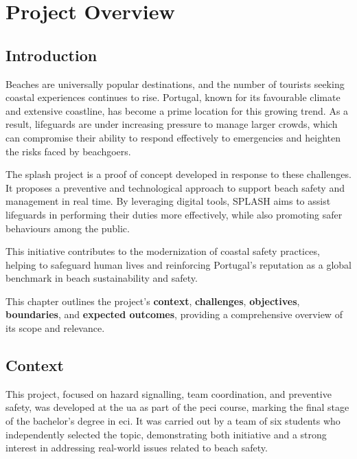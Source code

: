 \chapter{Project Overview}
\label{chapter:overview}

\section{Introduction}
\label{section:intro}

Beaches are universally popular destinations, and the number of tourists seeking coastal experiences continues to rise. Portugal, known for its favourable climate and extensive coastline, has become a prime location for this growing trend. As a result, lifeguards are under increasing pressure to manage larger crowds, which can compromise their ability to respond effectively to emergencies and heighten the risks faced by beachgoers.




The \ac{splash} project is a proof of concept developed in response to these challenges. It proposes a preventive and technological approach to support beach safety and management in real time. By leveraging digital tools, SPLASH aims to assist lifeguards in performing their duties more effectively, while also promoting safer behaviours among the public.

This initiative contributes to the modernization of coastal safety practices, helping to safeguard human lives and reinforcing Portugal’s reputation as a global benchmark in beach sustainability and safety.

This chapter outlines the project's \textbf{context}, \textbf{challenges}, \textbf{objectives}, \textbf{boundaries}, and \textbf{expected outcomes}, providing a comprehensive overview of its scope and relevance.

\section{Context}
\label{section:context}

This project, focused on hazard signalling, team coordination, and preventive safety, was developed at the \ac{ua} as part of the \ac{peci} course, marking the final stage of the bachelor's degree in \ac{eci}. It was carried out by a team of six students who independently selected the topic, demonstrating both initiative and a strong interest in addressing real-world issues related to beach safety.

